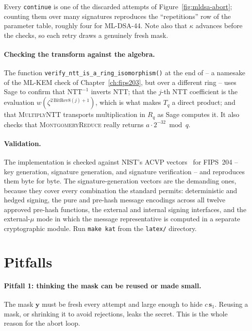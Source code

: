 Every \texttt{continue} is one of the discarded attempts of
Figure~\ref{fig:mldsa-abort}; counting them over many signatures reproduces
the ``repetitions'' row of the parameter table, roughly four for ML-DSA-44.
Note also that $\kappa$ advances before the checks, so each retry draws a
genuinely fresh mask.

\paragraph{Checking the transform against the algebra.}
The function \texttt{verify\_ntt\_is\_a\_ring\_isomorphism()} at the end of
 -- a namesake of the ML-KEM check of
Chapter~\ref{ch:fips203}, but over a different ring -- uses Sage to
confirm that $\mathrm{NTT}^{-1}$ inverts $\mathrm{NTT}$; that the $j$-th NTT
coefficient is the evaluation $w(\zeta^{2\,\mathrm{BitRev8}(j)+1})$, which is
what makes $T_q$ a direct product; and that \textsc{MultiplyNTT} transports
multiplication in $R_q$ as Sage computes it. It also checks that
\textsc{MontgomeryReduce} really returns $a\cdot 2^{-32} \bmod q$.

\paragraph{Validation.}
The implementation is checked against NIST's ACVP vectors~\cite{acvp} for FIPS~204 --
key generation, signature generation, and signature verification -- and
reproduces them byte for byte. The signature-generation vectors are the
demanding ones, because they cover every combination the standard permits:
deterministic and hedged signing, the pure and pre-hash message encodings
across all twelve approved pre-hash functions, the external and internal
signing interfaces, and the external-$\mu$ mode in which the message
representative is computed in a separate cryptographic module. Run
\texttt{make kat} from the \texttt{latex/} directory.

\section{Pitfalls}

\paragraph{Pitfall 1: thinking the mask can be reused or made small.}
The mask $\mathbf{y}$ must be fresh every attempt and large enough to hide $c\,\mathbf{s}_1$. Reusing a mask, or shrinking it to avoid rejections, leaks the secret. This is the whole reason for the abort loop.

